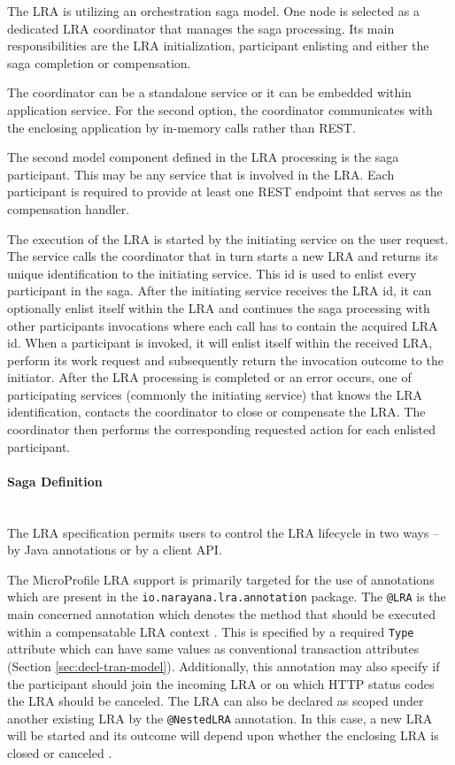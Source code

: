 \documentclass[oneside,
  digital, %
  table,   %
  lof,     %
  lot,     %
]{fithesis3}
\newcommand{\newlinepar}[1]{\paragraph{#1}\needspace{3\baselineskip}\mbox{}\\}
\begin{document}
The LRA is utilizing an orchestration saga model. One node is selected as a dedicated LRA coordinator that manages the saga processing. Its main responsibilities are the LRA initialization, participant enlisting and either the saga completion or compensation. 

The coordinator can be a standalone service or it can be embedded within application service. For the second option, the coordinator communicates with the enclosing application by in-memory calls rather than REST.

The second model component defined in the LRA processing is the saga participant. This may be any service that is involved in the LRA. Each participant is required to provide at least one REST endpoint that serves as the compensation handler.

The execution of the LRA is started by the initiating service on the user request. The service calls the coordinator that in turn starts a new LRA and returns its unique identification to the initiating service. This id is used to enlist every participant in the saga. After the initiating service receives the LRA id, it can optionally enlist itself within the LRA and continues the saga processing with other participants invocations where each call has to contain the acquired LRA id. When a participant is invoked, it will enlist itself within the received LRA, perform its work request and subsequently return the invocation outcome to the initiator. After the LRA processing is completed or an error occurs, one of participating services (commonly the initiating service) that knows the LRA identification, contacts the coordinator to close or compensate the LRA. The coordinator then performs the corresponding requested action for each enlisted participant.
 
\newlinepar{Saga Definition}

The LRA specification permits users to control the LRA lifecycle in two ways -- by Java annotations or by a client API. 

The MicroProfile LRA support is primarily targeted for the use of annotations which are present in the \texttt{io.narayana.lra.annotation} package. The \texttt{@LRA} is the main concerned annotation which denotes the method that should be executed within a compensatable LRA context \cite{narayana_lra}. This is specified by a required \texttt{Type} attribute which can have same values as conventional transaction attributes (Section \ref{sec:decl-tran-model}). Additionally, this annotation may also specify if the participant should join the incoming LRA or on which HTTP status codes the LRA should be canceled. The LRA can also be declared as scoped under another existing LRA by the \texttt{@NestedLRA} annotation. In this case, a new LRA will be started and its outcome will depend upon whether the enclosing LRA is closed or canceled \cite{narayana_lra}.
\end{document}
